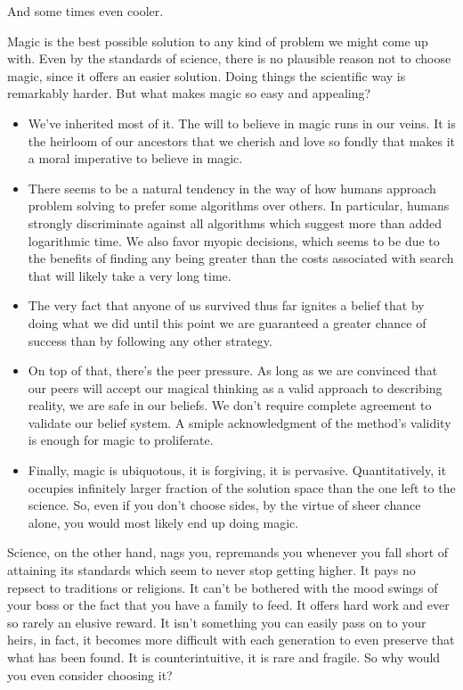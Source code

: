 \documentclass[11pt]{article}
\begin{document}
And some times even cooler.

Magic is the best possible solution to any kind of problem we might come up
with.  Even by the standards of science, there is no plausible reason not to
choose magic, since it offers an easier solution.  Doing things the
scientific way is remarkably harder.  But what makes magic so easy and
appealing?

\begin{itemize}
\item We've inherited most of it.  The will to believe in magic runs in our
veins.  It is the heirloom of our ancestors that we cherish and love so
fondly that makes it a moral imperative to believe in magic.
\item There seems to be a natural tendency in the way of how humans approach
problem solving to prefer some algorithms over others.  In particular,
humans strongly discriminate against all algorithms which suggest more than
added logarithmic time.  We also favor myopic decisions, which seems to be
due to the benefits of finding any being greater than the costs associated
with search that will likely take a very long time.
\item The very fact that anyone of us survived thus far ignites a belief
that by doing what we did until this point we are guaranteed a greater
chance of success than by following any other strategy.
\item On top of that, there's the peer pressure.  As long as we are convinced that 
our peers will accept our magical thinking as a valid approach to
describing reality, we are safe in our beliefs.  We don't require complete
agreement to validate our belief system.  A smiple acknowledgment of the
method's validity is enough for magic to proliferate.
\item Finally, magic is ubiquotous, it is forgiving, it is pervasive.  
Quantitatively, it occupies infinitely larger fraction of the solution
space than the one left to the science.  So, even if you don't choose
sides, by the virtue of sheer chance alone, you would most likely end up
doing magic.
\end{itemize}

Science, on the other hand, nags you, repremands you whenever you fall short
of attaining its standards which seem to never stop getting higher.  It pays
no repsect to traditions or religions.  It can't be bothered with the mood
swings of your boss or the fact that you have a family to feed.  It offers
hard work and ever so rarely an elusive reward.  It isn't something you can
easily pass on to your heirs, in fact, it becomes more difficult with each
generation to even preserve that what has been found.  It is
counterintuitive, it is rare and fragile.  So why would you even consider
choosing it?
\end{document}
